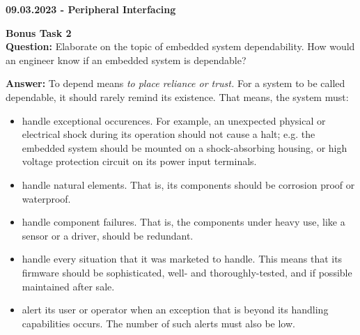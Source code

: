 \documentclass[12pt,a4paper]{letter}
\begin{document}
	\textbf{09.03.2023 - Peripheral Interfacing}

	\textbf{Bonus Task 2}\\

	\textbf{Question:} Elaborate on the topic of embedded system dependability. How would an engineer know if an embedded system is dependable?

	\textbf{Answer:} To depend means \textit{to place reliance or trust.} For a system to be called dependable, it should rarely remind its existence. That means, the system must:

	\begin{itemize}
		\item handle exceptional occurences. For example, an unexpected physical or electrical shock during its operation should not cause a halt; e.g. the embedded system should be mounted on a shock-absorbing housing, or high voltage protection circuit on its power input terminals.
		\item handle natural elements. That is, its components should be corrosion proof or waterproof.
		\item handle component failures. That is, the components under heavy use, like a sensor or a driver, should be redundant.
		\item handle every situation that it was marketed to handle. This means that its firmware should be sophisticated, well- and thoroughly-tested, and if possible maintained after sale.
		\item alert its user or operator when an exception that is beyond its handling capabilities occurs. The number of such alerts must also be low.
	\end{itemize}
\end{document}
